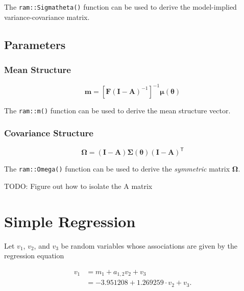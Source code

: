 \documentclass[
]{book}
\begin{document}
\noindent The \texttt{ram::Sigmatheta()} function can be used
to derive the model-implied variance-covariance matrix.

\hypertarget{parameters}{%
\section{Parameters}\label{parameters}}

\hypertarget{mean-structure}{%
\subsection{Mean Structure}\label{mean-structure}}

\begin{equation}
  \mathbf{m}
  =
  \left[
    \mathbf{F}
    \left( \mathbf{I} - \mathbf{A} \right)^{-1}
  \right]^{-1}
  \boldsymbol{\mu} \left( \boldsymbol{\theta} \right)
\end{equation}

\noindent The \texttt{ram::m()} function can be used
to derive the mean structure vector.

\hypertarget{covariance-structure}{%
\subsection{Covariance Structure}\label{covariance-structure}}

\begin{equation}
  \boldsymbol{\Omega}
  =
  \left( \mathbf{I} - \mathbf{A} \right)
  \boldsymbol{\Sigma} \left( \boldsymbol{\theta} \right)
  \left( \mathbf{I} - \mathbf{A} \right)^{\mathsf{T}}
\end{equation}

\noindent The \texttt{ram::Omega()} function can be used
to derive the \emph{symmetric} matrix \(\boldsymbol{\Omega}\).

TODO: Figure out how to isolate the A matrix

\hypertarget{simple-regression}{%
\chapter{Simple Regression}\label{simple-regression}}

Let \(v_1\), \(v_2\), and \(v_3\) be random variables whose associations are given by the regression equation

\begin{equation}
  \begin{split}
    v_1
    &=
    m_1 + a_{1, 2} v_2 + v_3 \\
    &=
    -3.951208 + 1.269259 \cdot v_2 + v_3 .
  \end{split}
\end{equation}
\end{document}
